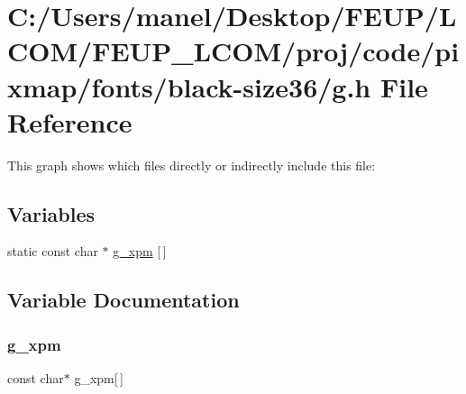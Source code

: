 \hypertarget{black-size36_2g_8h}{}\section{C\+:/\+Users/manel/\+Desktop/\+F\+E\+U\+P/\+L\+C\+O\+M/\+F\+E\+U\+P\+\_\+\+L\+C\+O\+M/proj/code/pixmap/fonts/black-\/size36/g.h File Reference}
\label{black-size36_2g_8h}
This graph shows which files directly or indirectly include this file\+:
\subsection*{Variables}
\begin{DoxyCompactItemize}
\item 
static const char $\ast$ \mbox{\hyperlink{black-size36_2g_8h_a975a2f88ff925f2d6930f038cbabf822}{g\+\_\+xpm}} \mbox{[}$\,$\mbox{]}
\end{DoxyCompactItemize}


\subsection{Variable Documentation}
\mbox{\label{black-size36_2g_8h_a975a2f88ff925f2d6930f038cbabf822}} 
\subsubsection{\texorpdfstring{g\_xpm}{g\_xpm}}
{\footnotesize\ttfamily const char$\ast$ g\+\_\+xpm\mbox{[}$\,$\mbox{]}\hspace{0.3cm}{\ttfamily [static]}}

